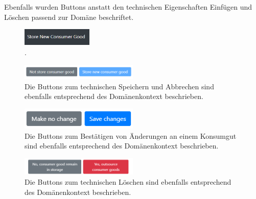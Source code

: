 Ebenfalls wurden Buttons anstatt den technischen Eigenschaften Einfügen und Löschen passend zur Domäne beschriftet.

\begin{figure}[H]
	\centering
	\includegraphics[width=0.3\textwidth]{Bilder/gui/Ubiquitous Language/Store new consumer good.PNG}
	\caption[Button zum Öffnen der Eingabemaske zum Einlagern eines Konsumguts.]{.}
	\label{fig:gui-button-eingabemaske-einlagern}
\end{figure}

\begin{figure}[H]
	\centering
	\includegraphics[width=0.5\textwidth]{Bilder/gui/Ubiquitous Language/store-buttons.PNG}
	\caption[Buttons zum Bestätigen des Einlagerns eines Konsumguts.]{Die Buttons zum technischen Speichern und Abbrechen sind ebenfalls entsprechend des Domänenkontext beschrieben.}
	\label{fig:gui-button-einlagern}
\end{figure}

\begin{figure}[H]
	\centering
	\includegraphics[width=0.5\textwidth]{Bilder/gui/Ubiquitous Language/edit-buttons.PNG}
	\caption[Buttons zum Bestätigen von Änderungen der Attribute eines Konsumguts.]{Die Buttons zum Bestätigen von Änderungen an einem Konsumgut sind ebenfalls entsprechend des Domänenkontext beschrieben.}
	\label{fig:gui-button-aendern}
\end{figure}

\begin{figure}[H]
	\centering
	\includegraphics[width=0.5\textwidth]{Bilder/gui/Ubiquitous Language/outsource-buttons.PNG}
	\caption[Buttons zum Bestätigen des Auslagern eines Konsumguts.]{Die Buttons zum technischen Löschen sind ebenfalls entsprechend des Domänenkontext beschrieben.}
	\label{fig:gui-button-auslagern}
\end{figure}

